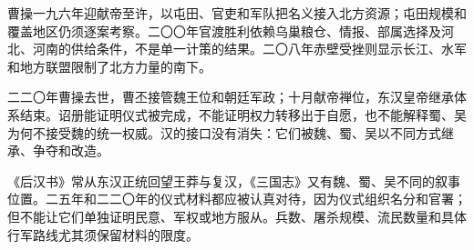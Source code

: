 曹操一九六年迎献帝至许，以屯田、官吏和军队把名义接入北方资源；屯田规模和覆盖地区仍须逐案考察。二〇〇年官渡胜利依赖乌巢粮仓、情报、部属选择及河北、河南的供给条件，不是单一计策的结果。二〇八年赤壁受挫则显示长江、水军和地方联盟限制了北方力量的南下。

二二〇年曹操去世，曹丕接管魏王位和朝廷军政；十月献帝禅位，东汉皇帝继承体系结束。诏册能证明仪式被完成，不能证明权力转移出于自愿，也不能解释蜀、吴为何不接受魏的统一权威。汉的接口没有消失：它们被魏、蜀、吴以不同方式继承、争夺和改造。

\begin{sourcenote}[复汉与禅代的两个陷阱]
《后汉书》常从东汉正统回望王莽与复汉，《三国志》又有魏、蜀、吴不同的叙事位置。二五年和二二〇年的仪式材料都应被认真对待，因为仪式组织名分和官署；但不能让它们单独证明民意、军权或地方服从。兵数、屠杀规模、流民数量和具体行军路线尤其须保留材料的限度。
\end{sourcenote}
